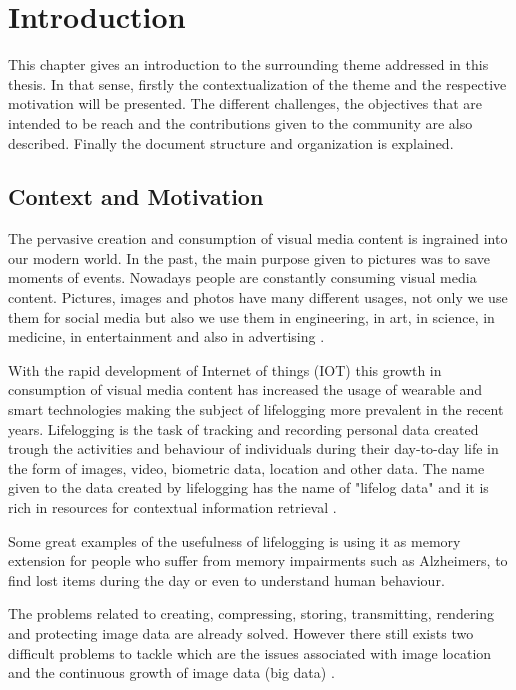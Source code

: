 \cleardoublepage

\chapter{Introduction}
\label{ch:introduction}
This chapter gives an introduction to the surrounding theme addressed in this thesis. In that sense, firstly the contextualization of the theme and the respective motivation will be presented. The different challenges, the objectives that are intended to be reach and the contributions given to the community are also described. Finally the document structure and organization is explained.


\section{Context and Motivation}

The pervasive creation and consumption of visual media content is ingrained into our modern world. In the past, the main purpose given to pictures was to save moments of events. Nowadays people are constantly consuming visual media content. Pictures, images and photos have many different usages, not only we use them for social media but also we use them in engineering, in art, in science, in medicine, in entertainment and also in advertising \cite{Zhang2008}.



With the rapid development of Internet of things (IOT) this growth in consumption of visual media content has increased the usage of wearable and smart technologies making the subject of lifelogging more prevalent in the recent years. Lifelogging is the task of tracking and recording personal data created trough the activities and behaviour of individuals during their day-to-day life in the form of images, video, biometric data, location and other data. The name given to the data created by lifelogging has the name of "lifelog data" and it is rich in resources for contextual information retrieval \cite{Ribeiro}.

Some great examples of the usefulness of lifelogging is using it as memory extension for people who suffer from memory impairments such as Alzheimers, to find lost items during the day or even to understand human behaviour.

The problems related to creating, compressing, storing, transmitting, rendering and protecting image data are already solved. However there still exists two difficult problems to tackle which are the issues associated with image location and the continuous growth of image data (big data) \cite{Zhang2008}.

